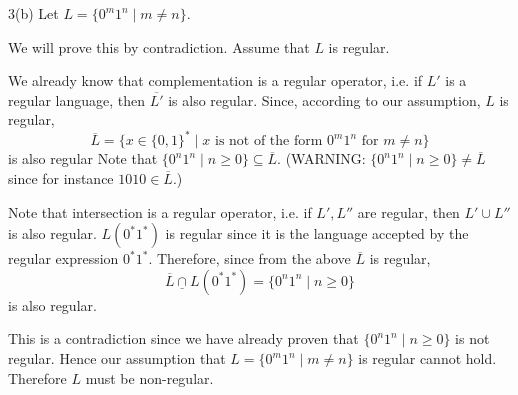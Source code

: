 

3(b)
Let $L = \{0^m 1^n \mid m \neq n \}$.

We will prove this by contradiction.
Assume that $L$ is regular.

We already know that complementation is a regular operator,
i.e. if $L'$ is a regular language, then
$\overline{L'}$ is also regular.
Since, according to our assumption, $L$ is regular,
\[
\overline{L} = \{x \in \{0,1\}^* \mid x \text{ is not of the form } 0^m 1^n
\text{ for } m \neq n \}
\] 
is also regular
Note that $\{0^n 1^n \mid n \geq 0\} \subseteq \overline{L}$.
(WARNING: $\{0^n 1^n \mid n \geq 0\} \neq \overline{L}$
since for instance $1010 \in \overline{L}$.)

Note that intersection is a regular operator, i.e.
if $L', L''$ are regular, then $L' \cup L''$ is also regular.
$L(0^*1^*)$ is regular since it is the language accepted by the
regular expression $0^* 1^*$.
Therefore, since from the above $\overline{L}$ is regular,
\[
\overline{L} \underline{\cap} L(0^* 1^*) = \{0^n 1^n \mid n \geq 0\}
\]
is also regular.

This is a contradiction since we have already proven that 
$\{0^n 1^n \mid n \geq 0\}$
is not regular.
Hence our assumption that $L = \{0^m 1^n \mid m \neq n \}$
is regular cannot hold.
Therefore $L$ must be non-regular.
